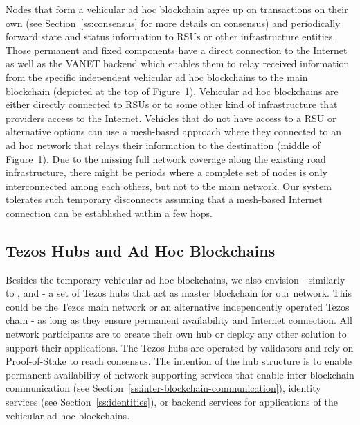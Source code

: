 \documentclass{llncs}
\begin{document}
{\begin{figure}[H]
				\label{fig:architecture-overview}
			\end{figure}
			Nodes that form a vehicular ad hoc blockchain agree up on transactions on their own (see Section~\ref{ss:consensus} for more details on consensus) and periodically forward state and status information to RSUs or other infrastructure entities. Those permanent and fixed components have a direct connection to the Internet as well as the VANET backend which enables them to relay received information from the specific independent vehicular ad hoc blockchains to the main blockchain (depicted at the top of Figure~\ref{fig:architecture-overview}). Vehicular ad hoc blockchains are either directly connected to RSUs or to some other kind of infrastructure that providers access to the Internet. Vehicles that do not have access to a RSU or alternative options can use a mesh-based approach where they connected to an ad hoc network that relays their information to the destination (middle of Figure~\ref{fig:architecture-overview}). Due to the missing full network coverage along the existing road infrastructure, there might be periods where a complete set of nodes is only interconnected among each others, but not to the main network. Our system tolerates such temporary disconnects assuming that a mesh-based Internet connection can be established within a few hops.

		
		\subsection{Tezos Hubs and Ad Hoc Blockchains}
			\label{ss:blockchain-hubs}
			
			Besides the temporary vehicular ad hoc blockchains, we also envision - similarly to  \cite{monetWhitepaper}, \cite{cosmosWhitepaper} and \cite{chorus2018MCIS}- a set of Tezos hubs that act as master blockchain for our network. This could be the Tezos main network or an alternative independently operated Tezos chain - as long as they ensure permanent availability and Internet connection. All network participants are to create their own hub or deploy any other solution to support their applications. The Tezos hubs are operated by validators and rely on Proof-of-Stake to reach consensus. The intention of the hub structure is to enable permanent availability of network supporting services that enable inter-blockchain communication (see Section~\ref{ss:inter-blockchain-communication}), identity services (see Section~\ref{ss:identities}), or backend services for applications of the vehicular ad hoc blockchains.
			
}
\end{document}
